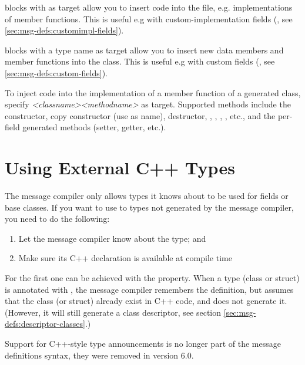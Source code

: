  blocks with  as target allow you to insert code
into the  file, e.g. implementations of member functions. This is
useful e.g with custom-implementation fields (, see
\ref{sec:msg-defs:customimpl-fields}).

 blocks with a type name as target allow you to insert new
data members and member functions into the class. This is useful e.g with custom
fields (, see \ref{sec:msg-defs:custom-fields}).

To inject code into the implementation of a member function of a generated
class, specify \textit{<classname>}\ttt{::}\textit{<methodname>} as target.
Supported methods include the constructor, copy constructor (use  as
name), destructor, , , ,
, etc., and the per-field generated methods (setter, getter,
etc.).



\section{Using External C++ Types}
\label{sec:msg-defs:using-cpp-types}
\label{sec:msg-defs:announcing-types} %

The message compiler only allows types it knows about to be used for fields or
base classes. If you want to use to types not generated by the message compiler,
you need to do the following:

\begin{enumerate}
   \item Let the message compiler know about the type; and
   \item Make sure its C++ declaration is available at compile time
\end{enumerate}

For the first one can be achieved with the  property. When
a type (class or struct) is annotated with , the message
compiler remembers the definition, but assumes that the class (or struct)
already exist in C++ code, and does not generate it. (However, it will still
generate a class descriptor, see section \ref{sec:msg-defs:descriptor-classes}.)

\begin{note}
Support for C++-style type announcements is no longer part of the message
definitions syntax, they were removed in {\opp} version 6.0.
\end{note}

